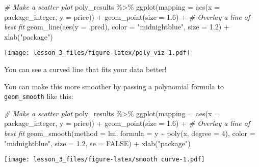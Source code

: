 \documentclass[
]{article}
\newenvironment{Shaded}{\begin{snugshade}}{\end{snugshade}}
\newcommand{\AttributeTok}[1]{\textcolor[rgb]{0.77,0.63,0.00}{#1}}
\newcommand{\CommentTok}[1]{\textcolor[rgb]{0.56,0.35,0.01}{\textit{#1}}}
\newcommand{\ConstantTok}[1]{\textcolor[rgb]{0.00,0.00,0.00}{#1}}
\newcommand{\DecValTok}[1]{\textcolor[rgb]{0.00,0.00,0.81}{#1}}
\newcommand{\FloatTok}[1]{\textcolor[rgb]{0.00,0.00,0.81}{#1}}
\newcommand{\FunctionTok}[1]{\textcolor[rgb]{0.00,0.00,0.00}{#1}}
\newcommand{\NormalTok}[1]{#1}
\newcommand{\SpecialCharTok}[1]{\textcolor[rgb]{0.00,0.00,0.00}{#1}}
\newcommand{\StringTok}[1]{\textcolor[rgb]{0.31,0.60,0.02}{#1}}
\begin{document}
\begin{Shaded}
\begin{Highlighting}[]
\CommentTok{\# Make a scatter plot}
\NormalTok{poly\_results }\SpecialCharTok{\%\textgreater{}\%} 
  \FunctionTok{ggplot}\NormalTok{(}\AttributeTok{mapping =} \FunctionTok{aes}\NormalTok{(}\AttributeTok{x =}\NormalTok{ package\_integer, }\AttributeTok{y =}\NormalTok{ price)) }\SpecialCharTok{+}
  \FunctionTok{geom\_point}\NormalTok{(}\AttributeTok{size =} \FloatTok{1.6}\NormalTok{) }\SpecialCharTok{+}
  \CommentTok{\# Overlay a line of best fit}
  \FunctionTok{geom\_line}\NormalTok{(}\FunctionTok{aes}\NormalTok{(}\AttributeTok{y =}\NormalTok{ .pred), }\AttributeTok{color =} \StringTok{"midnightblue"}\NormalTok{, }\AttributeTok{size =} \FloatTok{1.2}\NormalTok{) }\SpecialCharTok{+}
  \FunctionTok{xlab}\NormalTok{(}\StringTok{"package"}\NormalTok{)}
\end{Highlighting}
\end{Shaded}

\texttt{[image: lesson\_3\_files/figure-latex/poly\_viz-1.pdf]}

You can see a curved line that fits your data better! 🤩

You can make this more smoother by passing a polynomial formula to
\texttt{geom\_smooth} like this:

\begin{Shaded}
\begin{Highlighting}[]
\CommentTok{\# Make a scatter plot}
\NormalTok{poly\_results }\SpecialCharTok{\%\textgreater{}\%} 
  \FunctionTok{ggplot}\NormalTok{(}\AttributeTok{mapping =} \FunctionTok{aes}\NormalTok{(}\AttributeTok{x =}\NormalTok{ package\_integer, }\AttributeTok{y =}\NormalTok{ price)) }\SpecialCharTok{+}
  \FunctionTok{geom\_point}\NormalTok{(}\AttributeTok{size =} \FloatTok{1.6}\NormalTok{) }\SpecialCharTok{+}
  \CommentTok{\# Overlay a line of best fit}
  \FunctionTok{geom\_smooth}\NormalTok{(}\AttributeTok{method =}\NormalTok{ lm, }\AttributeTok{formula =}\NormalTok{ y }\SpecialCharTok{\textasciitilde{}} \FunctionTok{poly}\NormalTok{(x, }\AttributeTok{degree =} \DecValTok{4}\NormalTok{), }\AttributeTok{color =} \StringTok{"midnightblue"}\NormalTok{, }\AttributeTok{size =} \FloatTok{1.2}\NormalTok{, }\AttributeTok{se =} \ConstantTok{FALSE}\NormalTok{) }\SpecialCharTok{+}
  \FunctionTok{xlab}\NormalTok{(}\StringTok{"package"}\NormalTok{)}
\end{Highlighting}
\end{Shaded}

\texttt{[image: lesson\_3\_files/figure-latex/smooth curve-1.pdf]}
\end{document}
